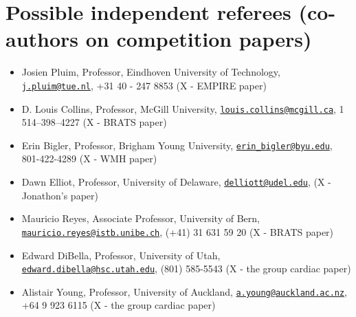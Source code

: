 \documentclass[12pt,]{article}
\providecommand{\tightlist}{%
  \setlength{\itemsep}{0pt}\setlength{\parskip}{0pt}}
\begin{document}
\section{Possible independent referees (co-authors on competition
papers)}\label{possible-independent-referees-co-authors-on-competition-papers}

\begin{itemize}
\tightlist
\item
  Josien Pluim, Professor, Eindhoven University of Technology,
  \href{mailto:j.pluim@tue.nl}{\nolinkurl{j.pluim@tue.nl}}, +31 40 - 247
  8853 (X - EMPIRE paper)
\item
  D. Louis Collins, Professor, McGill University,
  \href{mailto:louis.collins@mcgill.ca}{\nolinkurl{louis.collins@mcgill.ca}},
  1 514--398--4227 (X - BRATS paper)
\item
  Erin Bigler, Professor, Brigham Young University,
  \href{mailto:erin_bigler@byu.edu}{\nolinkurl{erin\_bigler@byu.edu}},
  801-422-4289 (X - WMH paper)
\item
  Dawn Elliot, Professor, University of Delaware,
  \href{mailto:delliott@udel.edu}{\nolinkurl{delliott@udel.edu}}, (X -
  Jonathon's paper)
\item
  Mauricio Reyes, Associate Professor, University of Bern,
  \href{mailto:mauricio.reyes@istb.unibe.ch}{\nolinkurl{mauricio.reyes@istb.unibe.ch}},
  (+41) 31 631 59 20 (X - BRATS paper)
\item
  Edward DiBella, Professor, University of Utah,
  \href{mailto:edward.dibella@hsc.utah.edu}{\nolinkurl{edward.dibella@hsc.utah.edu}},
  (801) 585-5543 (X - the group cardiac paper)
\item
  Alistair Young, Professor, University of Auckland,
  \href{mailto:a.young@auckland.ac.nz}{\nolinkurl{a.young@auckland.ac.nz}},
  +64 9 923 6115 (X - the group cardiac paper)
\end{itemize}
\end{document}
